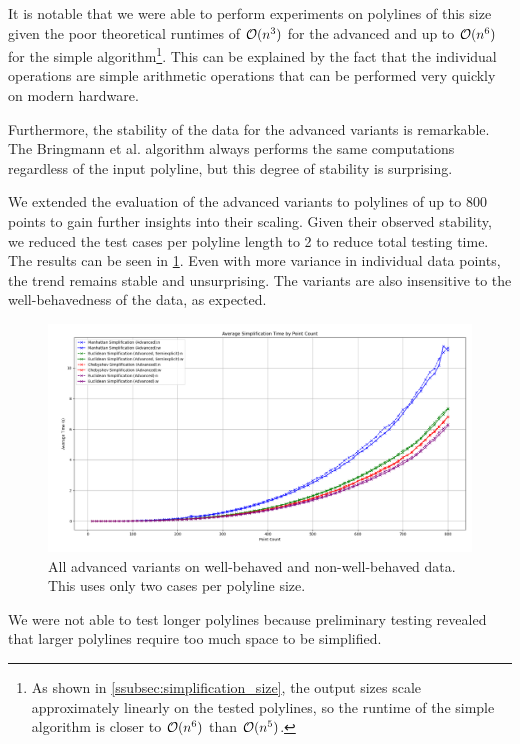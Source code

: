 It is notable that we were able to perform experiments on polylines of this size given the poor theoretical runtimes of \(\mathcal{O}(n^3)\) for the advanced and up to \(\mathcal{O}(n^6)\) for the simple algorithm\footnote{As shown in \cref{ssubsec:simplification_size}, the output sizes scale approximately linearly on the tested polylines, so the runtime of the simple algorithm is closer to \(\mathcal{O}(n^6)\) than \(\mathcal{O}(n^5)\).}. This can be explained by the fact that the individual operations are simple arithmetic operations that can be performed very quickly on modern hardware.

Furthermore, the stability of the data for the advanced variants is remarkable. The Bringmann et al. algorithm always performs the same computations regardless of the input polyline, but this degree of stability is surprising.

We extended the evaluation of the advanced variants to polylines of up to 800 points to gain further insights into their scaling. Given their observed stability, we reduced the test cases per polyline length to 2 to reduce total testing time. The results can be seen in \cref{fig:res_advanced800}. Even with more variance in individual data points, the trend remains stable and unsurprising. The variants are also insensitive to the well-behavedness of the data, as expected.

\begin{figure}[b]
  \centering
	\includegraphics[scale=0.4]{./figures/res_advanced800.png}
  \caption{All advanced variants on well-behaved and non-well-behaved data. This uses only two cases per polyline size.}
  \label{fig:res_advanced800}
\end{figure}

We were not able to test longer polylines because preliminary testing revealed that larger polylines require too much space to be simplified.


